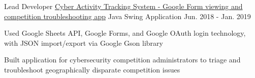 \begin{cventries}
  \cventry
    {Lead Developer} %
    {\href{https://github.com/hexalellogram/CATS-OSS}{Cyber Activity Tracking System - Google Form viewing and competition troubleshooting app}} %
    {Java Swing Application} %
    {Jun. 2018 - Jan. 2019} %
    {
      \begin{cvitems} %
        \item {Used Google Sheets API, Google Forms, and Google OAuth login technology, with JSON import/export via Google Gson library}
        \item {Built application for cybersecurity competition administrators to triage and troubleshoot geographically disparate competition issues}
      \end{cvitems}
    }
    
\end{cventries}